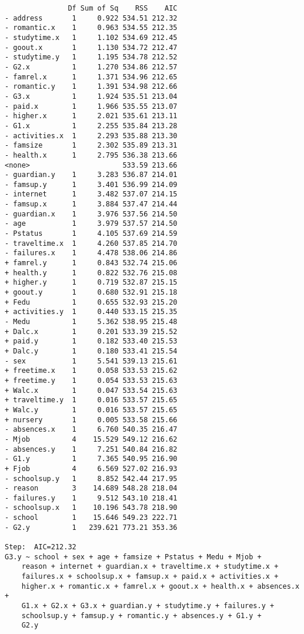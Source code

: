 \documentclass[11pt]{article}
\begin{document}
\begin{enumerate}
\begin{verbatim}
               Df Sum of Sq    RSS    AIC
- address       1     0.922 534.51 212.32
- romantic.x    1     0.963 534.55 212.35
- studytime.x   1     1.102 534.69 212.45
- goout.x       1     1.130 534.72 212.47
- studytime.y   1     1.195 534.78 212.52
- G2.x          1     1.270 534.86 212.57
- famrel.x      1     1.371 534.96 212.65
- romantic.y    1     1.391 534.98 212.66
- G3.x          1     1.924 535.51 213.04
- paid.x        1     1.966 535.55 213.07
- higher.x      1     2.021 535.61 213.11
- G1.x          1     2.255 535.84 213.28
- activities.x  1     2.293 535.88 213.30
- famsize       1     2.302 535.89 213.31
- health.x      1     2.795 536.38 213.66
<none>                      533.59 213.66
- guardian.y    1     3.283 536.87 214.01
- famsup.y      1     3.401 536.99 214.09
- internet      1     3.482 537.07 214.15
- famsup.x      1     3.884 537.47 214.44
- guardian.x    1     3.976 537.56 214.50
- age           1     3.979 537.57 214.50
- Pstatus       1     4.105 537.69 214.59
- traveltime.x  1     4.260 537.85 214.70
- failures.x    1     4.478 538.06 214.86
+ famrel.y      1     0.843 532.74 215.06
+ health.y      1     0.822 532.76 215.08
+ higher.y      1     0.719 532.87 215.15
+ goout.y       1     0.680 532.91 215.18
+ Fedu          1     0.655 532.93 215.20
+ activities.y  1     0.440 533.15 215.35
- Medu          1     5.362 538.95 215.48
+ Dalc.x        1     0.201 533.39 215.52
+ paid.y        1     0.182 533.40 215.53
+ Dalc.y        1     0.180 533.41 215.54
- sex           1     5.541 539.13 215.61
+ freetime.x    1     0.058 533.53 215.62
+ freetime.y    1     0.054 533.53 215.63
+ Walc.x        1     0.047 533.54 215.63
+ traveltime.y  1     0.016 533.57 215.65
+ Walc.y        1     0.016 533.57 215.65
+ nursery       1     0.005 533.58 215.66
- absences.x    1     6.760 540.35 216.47
- Mjob          4    15.529 549.12 216.62
- absences.y    1     7.251 540.84 216.82
- G1.y          1     7.365 540.95 216.90
+ Fjob          4     6.569 527.02 216.93
- schoolsup.y   1     8.852 542.44 217.95
- reason        3    14.689 548.28 218.04
- failures.y    1     9.512 543.10 218.41
- schoolsup.x   1    10.196 543.78 218.90
- school        1    15.646 549.23 222.71
- G2.y          1   239.621 773.21 353.36

Step:  AIC=212.32
G3.y ~ school + sex + age + famsize + Pstatus + Medu + Mjob + 
    reason + internet + guardian.x + traveltime.x + studytime.x + 
    failures.x + schoolsup.x + famsup.x + paid.x + activities.x + 
    higher.x + romantic.x + famrel.x + goout.x + health.x + absences.x + 
    G1.x + G2.x + G3.x + guardian.y + studytime.y + failures.y + 
    schoolsup.y + famsup.y + romantic.y + absences.y + G1.y + 
    G2.y


\end{verbatim}
\end{enumerate}
\end{document}
